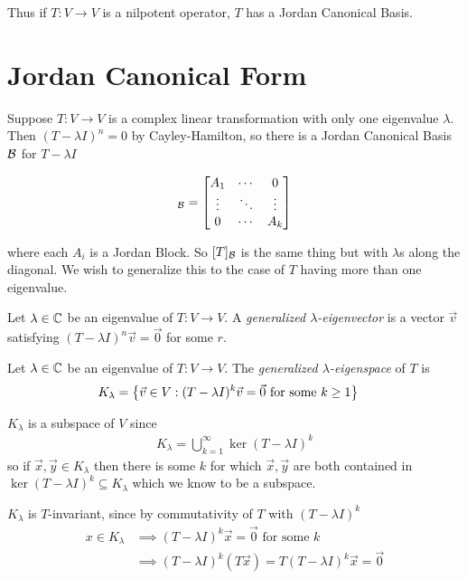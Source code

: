 Thus if $T : V \to V$ is a nilpotent operator, $T$ has a Jordan Canonical Basis.

\section{Jordan Canonical Form}

Suppose $T : V \to V$ is a complex linear transformation with only one eigenvalue $\lambda$.
Then $(T-\lambda I)^n = 0$ by Cayley-Hamilton, so there is a Jordan Canonical Basis $\mathcal{B}$ for $T - \lambda I$

\begin{align}
  [T-\lambda I]_{\sB} = \bmatr{
    A_1 & \cdots & 0 \\
    \vdots & \ddots & \vdots \\
    0 & \cdots & A_k
  }
\end{align}

where each $A_i$ is a Jordan Block. So $[T]_{\mathcal{B}}$ is the same thing but with $\lambda$s along the diagonal.
We wish to generalize this to the case of $T$ having more than one eigenvalue.

\begin{definition}
  Let $\lambda \in \mathbb{C}$ be an eigenvalue of $T : V \to V$. A \emph{generalized $\lambda$-eigenvector} is a vector $\vec v$
  satisfying $(T-\lambda I)^n \vec v = \vec 0$ for some $r$.
\end{definition}

\begin{definition}
  Let $\lambda \in \mathbb{C}$ be an eigenvalue of $T : V \to V$. The \emph{generalized $\lambda$-eigenspace} of $T$ is
  \begin{align}
    K_\lambda &= \left\{ \vec v \in V : (T-\lambda I)^k \vec v = \vec 0 \text{ for some } k \ge 1 \right\}
  \end{align}
\end{definition}

\begin{remark}
  $K_\lambda$ is a subspace of $V$ since
  \begin{align}
    K_\lambda = \bigcup_{k=1}^\infty \ker (T-\lambda I)^k
  \end{align}
  so if $\vec x, \vec y \in K_\lambda$ then there is some $k$ for which $\vec x, \vec y$ are both contained in $\ker (T-\lambda I)^k \subseteq K_\lambda$
  which we know to be a subspace.
\end{remark}

\begin{remark}
  $K_\lambda$ is $T$-invariant, since by commutativity of $T$ with $(T-\lambda I)^k$
  \begin{align}
    x \in K_\lambda
      &\implies (T-\lambda I)^k \vec x = \vec 0 \text{ for some } k \\
      &\implies (T-\lambda I)^k(T \vec x ) = T(T-\lambda I)^k \vec x = \vec 0
  \end{align}
\end{remark}

